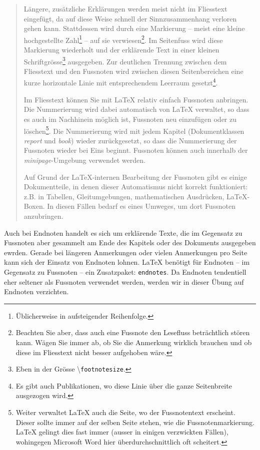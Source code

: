 \documentclass[11pt, a4paper]{article}
\newcommand{\ltx}{\LaTeX}
\let\oldmarginpar\marginpar
\renewcommand{\marginpar}[1]{\oldmarginpar{\textit{#1}}}
\begin{document}
\begin{quote}
Längere, zusätzliche Erklärungen werden meist nicht im Fliesstext eingefügt, da auf diese Weise schnell der Sinnzusammenhang verloren gehen kann. Stattdessen wird durch eine Markierung -- meist eine kleine hochgestellte Zahl\footnote{Üblicherweise in aufsteigender Reihenfolge.} -- auf sie verwiesen\footnote{Beachten Sie aber, dass auch eine Fussnote den Lesefluss beträchtlich stören kann. Wägen Sie immer ab, ob Sie die Anmerkung wirklich brauchen und ob diese im Fliesstext nicht besser aufgehoben wäre.}. Im Seitenfuss wird diese Markierung wiederholt und der erklärende Text in einer kleinen Schriftgrösse\footnote{Eben in der Grösse \textbackslash\texttt{footnotesize}.} ausgegeben. Zur deutlichen Trennung zwischen dem Fliesstext und den Fussnoten wird zwischen diesen Seitenbereichen eine kurze horizontale Linie mit entsprechendem Leerraum gesetzt\footnote{Es gibt auch Publikationen, wo diese Linie über die ganze Seitenbreite ausgezogen wird.}.

Im Fliesstext können Sie mit \ltx{} relativ einfach Fussnoten anbringen. Die Nummerierung wird dabei automatisch von \ltx{} verwaltet, so dass es auch im Nachhinein möglich ist, Fussnoten neu einzufügen oder zu löschen\footnote{Weiter verwaltet \ltx{} auch die Seite, wo der Fussnotentext erscheint. Dieser sollte immer auf der selben Seite stehen, wie die Fussnotenmarkierung. \ltx{} gelingt dies fast immer (ausser in einigen verzwickten Fällen), wohingegen Microsoft Word hier überdurchschnittlich oft scheitert.}. Die Nummerierung wird mit jedem Kapitel (Dokumentklassen \textit{report} und \textit{book}) wieder zurückgesetzt, so dass die Nummerierung der Fussnoten wieder bei Eins beginnt. Fussnoten können auch innerhalb der \textit{minipage}-Umgebung verwendet werden.

Auf Grund der \ltx-internen Bearbeitung der Fussnoten gibt es einige Dokumentteile, in denen dieser Automatismus nicht korrekt funktioniert: z.B. in Tabellen, Gleitumgebungen, mathematischen Ausdrücken, \ltx-Boxen. In diesen Fällen bedarf es eines Umweges, um dort Fussnoten anzubringen.
\end{quote}

Auch bei Endnoten\marginpar{Endnoten} handelt es sich um erklärende Texte, die im Gegensatz zu Fussnoten aber gesammelt am Ende des Kapitels oder des Dokuments ausgegeben ewrden. Gerade bei längeren Anmerkungen oder vielen Anmerkungen pro Seite kann sich der Einsatz von Endnoten lohnen. \ltx{} benötigt für Endnoten \parencite{lkgt} -- im Gegensatz zu Fussnoten -- ein Zusatzpaket: \texttt{endnotes}. Da Endnoten tendentiell eher seltener als Fussnoten verwendet werden, werden wir in dieser Übung auf Endnoten verzichten.
\end{document}
